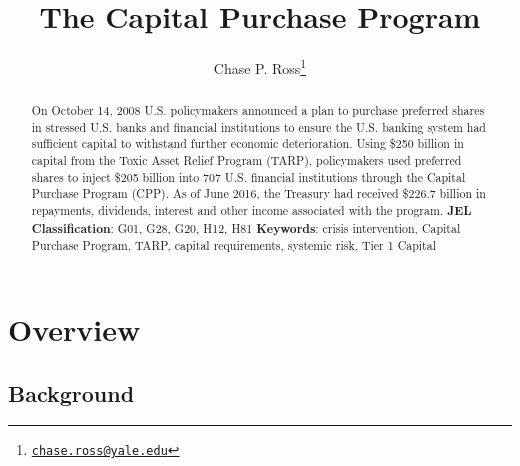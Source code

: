 \documentclass[12pt]{article}
\begin{document}
	\lhead{}
	\rhead{}
	\renewcommand{\headrulewidth}{0.0pt}
	\renewcommand{\footrulewidth}{0.0pt}

\title{The Capital Purchase Program}
\author{Chase P. Ross\thanks{\texttt{\href{mailto:chase.ross@yale.edu}{chase.ross@yale.edu}}}}
\date{}


\maketitle

\begin{abstract}
On October 14, 2008 U.S. policymakers announced a plan to purchase preferred shares in stressed U.S. banks and financial institutions to ensure the U.S. banking system had sufficient capital to withstand further economic deterioration. Using \$250 billion in capital from the Toxic Asset Relief Program (TARP), policymakers used preferred shares to inject \$205 billion into 707 U.S. financial institutions through the Capital Purchase Program (CPP). As of June 2016, the Treasury had received \$226.7 billion in repayments, dividends, interest and other income associated with the program.
\newline
\newline
\textbf{JEL Classification}: G01, G28, G20, H12, H81
\newline
\textbf{Keywords}: crisis intervention, Capital Purchase Program, TARP, capital requirements, systemic risk, Tier 1 Capital

\end{abstract}
\newpage
\tableofcontents
\newpage
\linenumbers
\section{Overview}

\subsection{Background}
\end{document}
